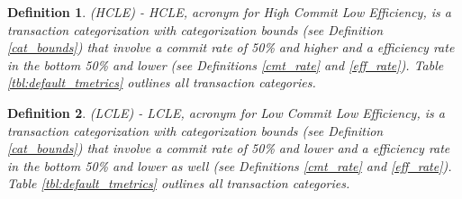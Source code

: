 \documentclass[conference]{IEEEtran}
\newtheorem{definition}{Definition}
\begin{document}
\begin{definition}
\label{ext_commit}
(HCLE) - HCLE, acronym for High Commit Low Efficiency, is a transaction categorization with categorization bounds (see Definition \ref{cat_bounds}) that involve a commit rate of 50\% and higher and a efficiency rate in the bottom 50\% and lower (see Definitions \ref{cmt_rate} and \ref{eff_rate}). Table \ref{tbl:default_tmetrics} outlines all transaction categories.
\end{definition}

\begin{definition}
\label{ext_abrt}
(LCLE) - LCLE, acronym for Low Commit Low Efficiency, is a transaction categorization with categorization bounds (see Definition \ref{cat_bounds}) that involve a commit rate of 50\% and lower and a efficiency rate in the bottom 50\% and lower as well (see Definitions \ref{cmt_rate} and \ref{eff_rate}). Table \ref{tbl:default_tmetrics} outlines all transaction categories.
\end{definition}

\end{document}
